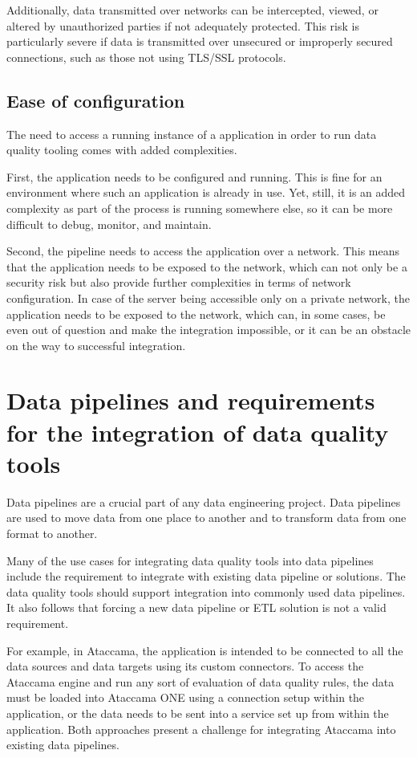 Additionally, data transmitted over networks can be intercepted, viewed, or altered by unauthorized parties if not adequately protected. This risk is particularly severe if data is transmitted over unsecured or improperly secured connections, such as those not using TLS/SSL protocols. 

\subsection{Ease of configuration}

The need to access a running instance of a  application in order to run data quality tooling comes with added complexities.

First, the application needs to be configured and running. This is fine for an environment where such an application is already in use. Yet, still, it is an added complexity as part of the process is running somewhere else, so it can be more difficult to debug, monitor, and maintain.

Second, the pipeline needs to access the application over a network. This means that the application needs to be exposed to the network, which can not only be a security risk but also provide further complexities in terms of network configuration. In case of the server being accessible only on a private network, the application needs to be exposed to the network, which can, in some cases, be even out of question and make the integration impossible, or it can be an obstacle on the way to successful integration.

\section{Data pipelines and requirements for the integration of data quality tools}

Data pipelines are a crucial part of any data engineering project. Data pipelines are used to move data from one place to another and to transform data from one format to another. 

Many of the use cases for integrating data quality tools into data pipelines include the requirement to integrate with existing data pipeline or solutions. The data quality tools should support integration into commonly used data pipelines. It also follows that forcing a new data pipeline or ETL solution is not a valid requirement. 

For example, in Ataccama, the application is intended to be connected to all the data sources and data targets using its custom connectors. To access the Ataccama engine and run any sort of evaluation of data quality rules, the data must be loaded into Ataccama ONE using a connection setup within the application, or the data needs to be sent into a service set up from within the application. Both approaches present a challenge for integrating Ataccama into existing data pipelines.

